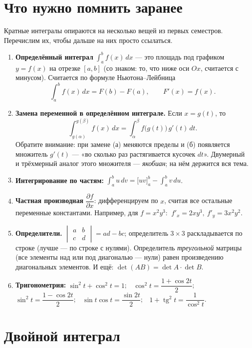 \section{Что нужно помнить заранее}
Кратные интегралы опираются на несколько вещей из первых семестров. Перечислим их, чтобы дальше на них просто ссылаться.

\begin{enumerate}[label=\textbf{\arabic*.}]
\item \textbf{Определённый интеграл} $\int_a^b f(x)\,dx$ --- это площадь под графиком $y=f(x)$ на отрезке $[a,b]$ (со знаком: то, что ниже оси $Ox$, считается с минусом). Считается по формуле Ньютона--Лейбница
\[
\int_a^b f(x)\,dx=F(b)-F(a),\qquad F'(x)=f(x).
\]
\item \textbf{Замена переменной в определённом интеграле.} Если $x=g(t)$, то
\[
\int_{g(\alpha)}^{g(\beta)} f(x)\,dx=\int_\alpha^\beta f\bigl(g(t)\bigr)\,g'(t)\,dt .
\]
Обратите внимание: при замене (а) меняются пределы и (б) появляется множитель $g'(t)$ --- «во сколько раз растягивается кусочек $dt$». Двумерный и трёхмерный аналог этого множителя --- \emph{якобиан}; на нём держится вся тема.
\item \textbf{Интегрирование по частям:} $\displaystyle\int_a^b u\,dv=\bigl[uv\bigr]_a^b-\int_a^b v\,du$.
\item \textbf{Частная производная} $\dfrac{\partial f}{\partial x}$: дифференцируем по $x$, считая все остальные переменные константами. Например, для $f=x^2y^3$: $\ f'_x=2xy^3,\ f'_y=3x^2y^2$.
\item \textbf{Определители.}
$\begin{vmatrix} a&b\\ c&d\end{vmatrix}=ad-bc$; определитель $3\times 3$ раскладывается по строке (лучше --- по строке с нулями).
Определитель \emph{треугольной} матрицы (все элементы над или под диагональю --- нули) равен произведению диагональных элементов. И ещё: $\det(AB)=\det A\cdot\det B$.
\item \textbf{Тригонометрия:} $\sin^2t+\cos^2t=1$;\ \ $\cos^2t=\dfrac{1+\cos2t}{2}$;\ \ $\sin^2t=\dfrac{1-\cos2t}{2}$;\ \ $\sin t\cos t=\dfrac{\sin2t}{2}$;\ \ $1+\operatorname{tg}^2t=\dfrac1{\cos^2t}$.
\end{enumerate}

\section{Двойной интеграл}
